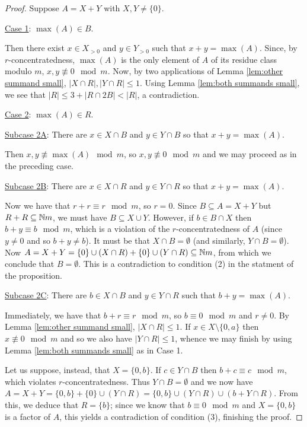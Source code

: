 \begin{proof}
Suppose $A = X + Y$ with $X,Y\neq\{0\}$.

\noindent \underline{Case 1}: $\max(A)\in B$.

Then there exist $x\in X_{>0}$ and $y\in Y_{>0}$ such that $x+y = \max(A)$.
Since, by $r$-concentratedness, $\max(A)$ is the only element of $A$ of its residue class modulo $m$, $x,y\not\equiv 0 \mod m$.
Now, by two applications of Lemma \ref{lem:other summand small}, $|X\cap R|, |Y\cap R|\le 1$.
Using Lemma \ref{lem:both summands small}, we see that $|R| \le 3 + |R\cap 2B| < |R|$, a contradiction.

\noindent \underline{Case 2}: $\max(A) \in R$.

\noindent \underline{Subcase 2A}: There are $x\in X\cap B$ and $y\in Y\cap B$ so that $x+y = \max(A)$.

Then $x,y\not\equiv \max(A) \mod m$, so $x,y\not\equiv 0 \mod m$ and we may proceed as in the preceding case.

\noindent \underline{Subcase 2B}: There are $x\in X\cap R$ and $y\in Y\cap R$ so that $x+y = \max(A)$.

Now we have that $r+r\equiv r \mod m$, so $r = 0$.
Since $B\subseteq A = X+Y$ but $R+R \subseteq \mathbb{N} m$, we must have $B \subseteq X \cup Y$.
However, if $b\in B\cap X$ then $b+y \equiv b \mod m$, which is a violation of the $r$-concentratedness of $A$ (since $y\neq 0$ and so $b+y\neq b$).
It must be that $X\cap B = \emptyset$ (and similarly, $Y\cap B = \emptyset$).
Now $A = X+Y = \{0\}\cup (X\cap R) + \{0\}\cup (Y\cap R) \subseteq \mathbb{N} m$, from which we conclude that $B = \emptyset$.
This is a contradiction to condition (2) in the statment of the proposition.

\noindent \underline{Subcase 2C}: There are $b\in X\cap B$ and $y\in Y\cap R$ such that $b + y = \max(A)$.

Immediately, we have that $b + r \equiv r \mod m$, so $b \equiv 0 \mod m$ and $r \neq 0$.
By Lemma \ref{lem:other summand small}, $|X\cap R| \le 1$.
If $x\in X\setminus \{0,a\}$ then $x\not\equiv 0\mod m$ and so we also have $|Y\cap R| \le 1$, whence we may finish by using Lemma \ref{lem:both summands small} as in Case 1.

Let us suppose, instead, that $X = \{0,b\}$.
If $c\in Y\cap B$ then $b+c \equiv c \mod m$, which violates $r$-concentratedness.
Thus $Y\cap B = \emptyset$ and we now have $A = X+Y = \{0,b\} + \{0\}\cup (Y\cap R) = \{0,b\} \cup (Y\cap R) \cup (b+ Y\cap R)$.
From this, we deduce that $R = \{b\}$; since we know that $b\equiv 0 \mod m$ and $X = \{0,b\}$ is a factor of $A$, this yields a contradiction of condition (3), finishing the proof.
\end{proof}

